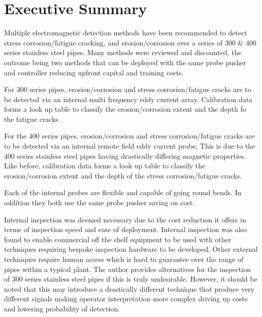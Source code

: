 \documentclass[a4paper,twoside,11pt]{article}
\begin{document}
\renewcommand{\bibname}{References}
{}
\pagestyle{plain}

\tableofcontents %
\newpage
{}

\section{Executive Summary}

Multiple electromagnetic detection methods have been recommended to detect stress corrosion/fatigue cracking, and erosion/corrosion over a series of 300 \& 400 series stainless steel pipes. 
Many methods were reviewed and discounted, the outcome being two methods that can be deployed with the same probe pusher and controller reducing upfront capital and training costs.

For 300 series pipes, erosion/corrosion and stress corrosion/fatigue cracks are to be detected via an internal multi frequency eddy current array. Calibration data forms a look up table to classify the erosion/corrosion extent and the depth fo the fatigue cracks. 

For the 400 series pipes, erosion/corrosion and stress corrosion/fatigue cracks are to be detected via an internal remote field eddy current probe. This is due to the 400 series stainless steel pipes having drastically differing magnetic properties. Like before, calibration data forms a look up table to classify the erosion/corrosion extent and the depth of the stress corrosion/fatigue cracks. 

Each of the internal probes are flexible and capable of going round bends. In addition they both use the same probe pusher saving on cost. 

Internal inspection was deemed necessary due to the cost reduction it offers in terms of inspection speed and ease of deployment. 
Internal inspection was also found to enable commercial off the shelf equipment to be used with other techniques requiring bespoke inspection hardware to be developed. 
Other external techniques require human access which is hard to guarantee over the range of pipes within a typical plant.
The author provides alternatives for the inspection of 300 series stainless steel pipes if this is truly undesirable. However, it should be noted that this may introduce a drastically different technique that produce very different signals making operator interpretation more complex driving up costs and lowering probability of detection.
\end{document}
